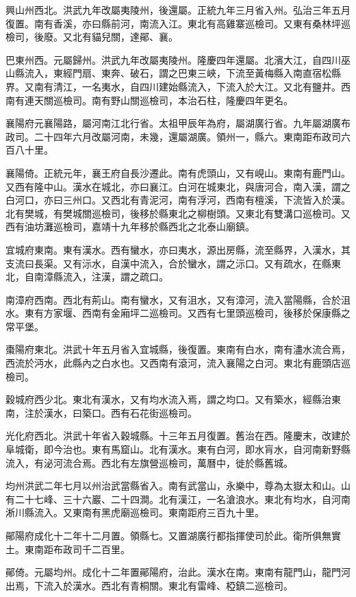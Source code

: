 興山州西北。洪武九年改屬夷陵州，後還屬。正統九年三月省入州。弘治三年五月復置。南有香溪，亦曰縣前河，南流入江。東北有高雞寨巡檢司。又東有桑林坪巡檢司，後廢。又北有貓兒關，達鄖、襄。

巴東州西。元屬歸州。洪武九年改屬夷陵州。隆慶四年還屬。北濱大江，自四川巫山縣流入，東經門扇、東奔、破石，謂之巴東三峽，下流至黃梅縣入南直宿松縣界。又南有清江，一名夷水，自四川建始縣流入，下流入於大江。又北有鹽井。西南有連天關巡檢司。南有野山關巡檢司，本治石柱，隆慶四年更名。

襄陽府元襄陽路，屬河南江北行省。太祖甲辰年為府，屬湖廣行省。九年屬湖廣布政司。二十四年六月改屬河南，未幾，還屬湖廣。領州一，縣六。東南距布政司六百八十里。

襄陽倚。正統元年，襄王府自長沙遷此。南有虎頭山，又有峴山。東南有鹿門山。又西有隆中山。漢水在城北，亦曰襄江。白河在城東北，與唐河合，南入漢，謂之白河口，亦曰三州口。又西北有青泥河，南有浮河，西南有檀溪，下流皆入於漢。北有樊城，有樊城關巡檢司，後移於縣東北之柳樹頭。又東北有雙溝口巡檢司。又西有油坊灘巡檢司，嘉靖十九年移於縣西北之北泰山廟鎮。

宜城府東南。東有漢水。西有蠻水，亦曰夷水，源出房縣，流至縣界，入漢水，其支流曰長渠。又有沶水，自漢中流入，合於蠻水，謂之沶口。又有疏水，在縣東北，自南漳縣流入，注漢，謂之疏口。

南漳府西南。西北有荊山。南有蠻水，又有沮水，又有漳河，流入當陽縣，合於沮水。東有方家堰、西南有金廂坪二巡檢司。又西有七里頭巡檢司，後移於保康縣之常平堡。

棗陽府東北。洪武十年五月省入宜城縣，後復置。東南有白水，南有濜水流合焉，西流於沔水，此縣內之白水也。又西南有滾河，流入襄陽之白河。東北有鹿頭店巡檢司。

穀城府西少北。東北有漢水，又有均水流入焉，謂之均口。又有築水，經縣治東南，注於漢水，曰築口。西有石花街巡檢司。

光化府西北。洪武十年省入穀城縣。十三年五月復置。舊治在西。隆慶末，改建於阜城衛，即今治也。東有馬窟山。北有漢水。東有白河，即水肓水，自河南新野縣流入，有泌河流合焉。西北有左旗營巡檢司，萬曆中，徙於縣舊城。

均州洪武二年七月以州治武當縣省入。南有武當山，永樂中，尊為太嶽太和山。山有二十七峰、三十六巖、二十四澗。北有漢江，一名滄浪水。東北有均水，自河南淅川縣流入。又東南有黑虎廟巡檢司。東南距府三百九十里。

鄖陽府成化十二年十二月置。領縣七。又置湖廣行都指揮使司於此。衛所俱無實土。東南距布政司千二百里。

鄖倚。元屬均州。成化十二年置鄖陽府，治此。漢水在南。東南有龍門山，龍門河出焉，下流入於漢水。西北有青桐關。東北有雷峰、椏鎮二巡檢司。

